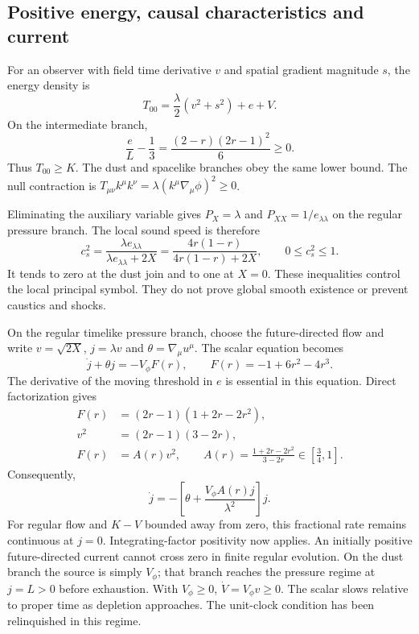 \documentclass[11pt]{article}
\begin{document}
\subsection{Positive energy, causal characteristics and current}
For an observer with field time derivative $v$ and spatial gradient magnitude
$s$, the energy density is
\begin{equation}
 T_{00}=\frac{\lambda}{2}(v^2+s^2)+e+V.
\end{equation}
On the intermediate branch,
\begin{equation}
 \frac{e}{L}-\frac13=\frac{(2-r)(2r-1)^2}{6}\ge0.
\end{equation}
Thus $T_{00}\ge K$. The dust and spacelike branches obey the same lower
bound. The null contraction is $T_{\mu\nu}k^\mu k^\nu
=\lambda(k^\mu\nabla_\mu\phi)^2\ge0$.

Eliminating the auxiliary variable gives $P_X=\lambda$ and
$P_{XX}=1/e_{\lambda\lambda}$ on the regular pressure branch.
The local sound speed is therefore\cite{Garriga}
\begin{equation}\label{eq:sound}
 c_s^2=\frac{\lambda e_{\lambda\lambda}}
 {\lambda e_{\lambda\lambda}+2X}
 =\frac{4r(1-r)}{4r(1-r)+2X},\qquad 0\le c_s^2\le1.
\end{equation}
It tends to zero at the dust join and to one at $X=0$. These inequalities
control the local principal symbol. They do not prove global smooth
existence or prevent caustics and shocks.

On the regular timelike pressure branch, choose the future-directed flow and write
$v=\sqrt{2X}$, $j=\lambda v$ and $\theta=\nabla_\mu u^\mu$.
The scalar equation becomes
\begin{equation}\label{eq:current}
 \dot j+\theta j=-V_\phi F(r),\qquad
 F(r)=-1+6r^2-4r^3.
\end{equation}
The derivative of the moving threshold in $e$ is essential in this equation.
Direct factorization gives
\begin{align}
 F(r)&=(2r-1)(1+2r-2r^2),\\
 v^2&=(2r-1)(3-2r),\\
 F(r)&=A(r)v^2,\qquad
 A(r)=\frac{1+2r-2r^2}{3-2r}\in[\tfrac34,1].
\end{align}
Consequently,
\begin{equation}\label{eq:regular}
 \dot j=-\left[\theta+\frac{V_\phi A(r)j}{\lambda^2}\right]j.
\end{equation}
For regular flow and $K-V$ bounded away from zero, this fractional rate
remains continuous at $j=0$. Integrating-factor positivity now applies.
An initially positive future-directed current cannot cross zero in finite
regular evolution. On the dust branch the source is simply $V_\phi$;
that branch reaches the pressure regime at $j=L>0$ before exhaustion.
With $V_\phi\ge0$, $\dot V=V_\phi v\ge0$.
The scalar slows relative to proper time as depletion approaches. The
unit-clock condition has been relinquished in this regime.
\end{document}
